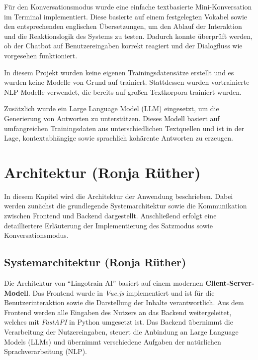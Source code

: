 Für den Konversationsmodus wurde eine einfache textbasierte Mini-Konversation im Terminal implementiert. 
Diese basierte auf einem festgelegten Vokabel sowie den entsprechenden englischen Übersetzungen, um den Ablauf der Interaktion und die Reaktionslogik des Systems zu testen. 
Dadurch konnte überprüft werden, ob der Chatbot auf Benutzereingaben korrekt reagiert und der Dialogfluss wie vorgesehen funktioniert.

In diesem Projekt wurden keine eigenen Trainingsdatensätze erstellt und es wurden keine Modelle von Grund auf trainiert. 
Stattdessen wurden vortrainierte NLP-Modelle verwendet, die bereits auf großen Textkorpora trainiert wurden.

Zusätzlich wurde ein Large Language Model (LLM) eingesetzt, um die Generierung von Antworten zu unterstützen. 
Dieses Modell basiert auf umfangreichen Trainingsdaten aus unterschiedlichen Textquellen und ist in der Lage, kontextabhängige sowie sprachlich kohärente Antworten zu erzeugen.

\section{Architektur (Ronja Rüther)}
In diesem Kapitel wird die Architektur der Anwendung beschrieben.
Dabei werden zunächst die grundlegende Systemarchitektur sowie die Kommunikation zwischen Frontend und Backend dargestellt. 
Anschließend erfolgt eine detailliertere Erläuterung der Implementierung des Satzmodus sowie Konversationsmodus.

\subsection{Systemarchitektur (Ronja Rüther)}
Die Architektur von \enquote{Lingotrain AI} basiert auf einem modernen \textbf{Client-Server-Modell}.
Das Frontend wurde in \textit{Vue.js} implementiert und ist für die Benutzerinteraktion sowie die Darstellung der Inhalte verantwortlich.
Aus dem Frontend werden alle Eingaben des Nutzers an das Backend weitergeleitet, welches mit \textit{FastAPI} in Python umgesetzt ist.
Das Backend übernimmt die Verarbeitung der Nutzereingaben, steuert die Anbindung an Large Language Models (LLMs) und übernimmt verschiedene Aufgaben der natürlichen Sprachverarbeitung (NLP).

